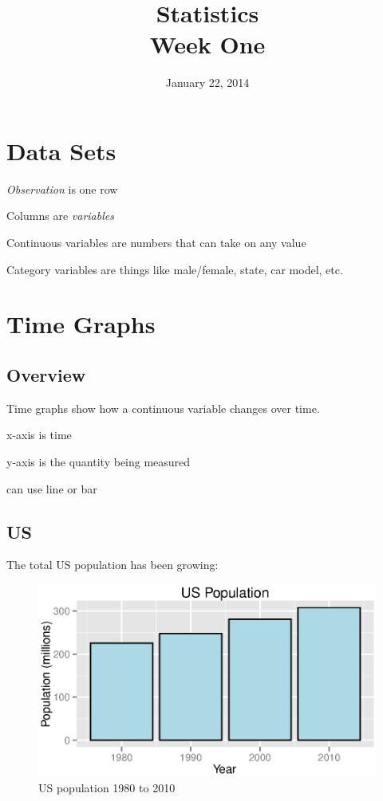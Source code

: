 \documentclass{exam}
\author{}
\date{January 22, 2014}
\title{Statistics \\ Week One}
\begin{document}
  \maketitle

  \section{Data Sets}
  \begin{itemize*}
    \item {\em Observation} is one row
    \item Columns are {\em variables}
    \item Continuous variables are numbers that can take on any value
    \item Category variables are things like male/female, state, car model, etc.
  \end{itemize*}

  \section{Time Graphs}

  \subsection{Overview}

  Time graphs show how a continuous variable changes over time.  

  \begin{itemize*}
    \item x-axis is time
    \item y-axis is the quantity being measured
    \item can use line or bar
  \end{itemize*}

  \subsection{US}
  The total US population has been growing:
  \begin{figure}[H]
    \centering
    \includegraphics[scale = 0.9]{figures/us_population.eps}
    \caption{US population 1980 to 2010}
  \end{figure}
\end{document}
